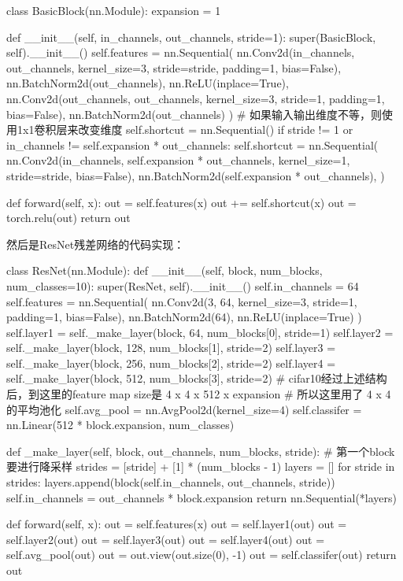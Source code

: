 \documentclass[UTF8,a4paper,10pt]{ctexart}
\begin{document}
\begin{python}
class BasicBlock(nn.Module):
    expansion = 1
    
    def __init__(self, in_channels, out_channels, stride=1):
        super(BasicBlock, self).__init__()
        self.features = nn.Sequential(
            nn.Conv2d(in_channels, out_channels, kernel_size=3, stride=stride, padding=1, bias=False),
            nn.BatchNorm2d(out_channels),
            nn.ReLU(inplace=True),
            nn.Conv2d(out_channels, out_channels, kernel_size=3, stride=1, padding=1, bias=False),
            nn.BatchNorm2d(out_channels)
        )
        # 如果输入输出维度不等，则使用1x1卷积层来改变维度
        self.shortcut = nn.Sequential()
        if stride != 1 or in_channels != self.expansion * out_channels:
            self.shortcut = nn.Sequential(
                nn.Conv2d(in_channels, self.expansion * out_channels, kernel_size=1, stride=stride, bias=False),
                nn.BatchNorm2d(self.expansion * out_channels),
            )
            
    def forward(self, x):
        out = self.features(x)
        out += self.shortcut(x)
        out = torch.relu(out)
        return out
\end{python}

然后是ResNet残差网络的代码实现：

\begin{python}
class ResNet(nn.Module):
    def __init__(self, block, num_blocks, num_classes=10):
        super(ResNet, self).__init__()
        self.in_channels = 64
        self.features = nn.Sequential(
            nn.Conv2d(3, 64, kernel_size=3, stride=1, padding=1, bias=False),
            nn.BatchNorm2d(64),
            nn.ReLU(inplace=True)
        )
        self.layer1 = self._make_layer(block, 64, num_blocks[0], stride=1)
        self.layer2 = self._make_layer(block, 128, num_blocks[1], stride=2)
        self.layer3 = self._make_layer(block, 256, num_blocks[2], stride=2)
        self.layer4 = self._make_layer(block, 512, num_blocks[3], stride=2)
        # cifar10经过上述结构后，到这里的feature map size是 4 x 4 x 512 x expansion
        # 所以这里用了 4 x 4 的平均池化
        self.avg_pool = nn.AvgPool2d(kernel_size=4)
        self.classifer = nn.Linear(512 * block.expansion, num_classes)
        
    def _make_layer(self, block, out_channels, num_blocks, stride):
        # 第一个block要进行降采样
        strides = [stride] + [1] * (num_blocks - 1)
        layers = []
        for stride in strides:
            layers.append(block(self.in_channels, out_channels, stride))
            self.in_channels = out_channels * block.expansion
        return nn.Sequential(*layers)
    
    def forward(self, x):
        out = self.features(x)
        out = self.layer1(out)
        out = self.layer2(out)
        out = self.layer3(out)
        out = self.layer4(out)
        out = self.avg_pool(out)
        out = out.view(out.size(0), -1)
        out = self.classifer(out)
        return out
\end{python}
\end{document}
